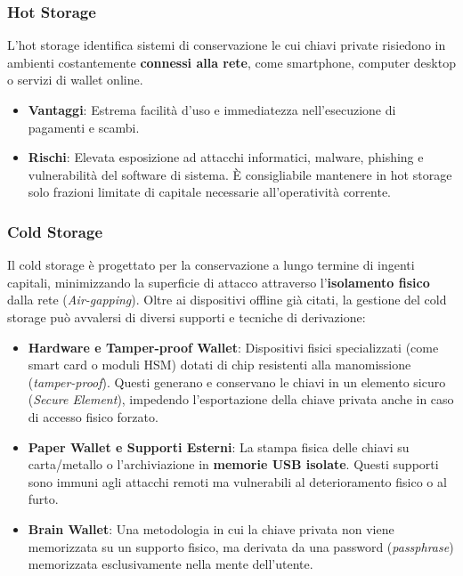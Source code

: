 \subsubsection*{Hot Storage}
L'hot storage identifica sistemi di conservazione le cui chiavi private risiedono in ambienti costantemente \textbf{connessi alla rete}, come smartphone, computer desktop o servizi di wallet online. 
\begin{itemize}
    \item \textbf{Vantaggi}: Estrema facilità d'uso e immediatezza nell'esecuzione di pagamenti e scambi.
    \item \textbf{Rischi}: Elevata esposizione ad attacchi informatici, malware, phishing e vulnerabilità del software di sistema. È consigliabile mantenere in hot storage solo frazioni limitate di capitale necessarie all'operatività corrente.
\end{itemize}

\subsubsection*{Cold Storage}
Il cold storage è progettato per la conservazione a lungo termine di ingenti capitali, minimizzando la superficie di attacco attraverso l'\textbf{isolamento fisico} dalla rete (\textit{Air-gapping}). Oltre ai dispositivi offline già citati, la gestione del cold storage può avvalersi di diversi supporti e tecniche di derivazione:

\begin{itemize}
    \item \textbf{Hardware e Tamper-proof Wallet}: Dispositivi fisici specializzati (come smart card o moduli HSM) dotati di chip resistenti alla manomissione (\textit{tamper-proof}). Questi generano e conservano le chiavi in un elemento sicuro (\textit{Secure Element}), impedendo l'esportazione della chiave privata anche in caso di accesso fisico forzato.
    \item \textbf{Paper Wallet e Supporti Esterni}: La stampa fisica delle chiavi su carta/metallo o l'archiviazione in \textbf{memorie USB isolate}. Questi supporti sono immuni agli attacchi remoti ma vulnerabili al deterioramento fisico o al furto.
    \item \textbf{Brain Wallet}: Una metodologia in cui la chiave privata non viene memorizzata su un supporto fisico, ma derivata da una password (\textit{passphrase}) memorizzata esclusivamente nella mente dell'utente. 
\end{itemize}

